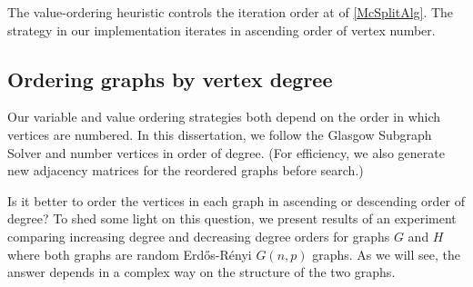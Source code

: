 The value-ordering heuristic controls the iteration
order at  of \cref{McSplitAlg}. The strategy
in our implementation iterates in ascending order of vertex number.

\subsection{Ordering graphs by vertex degree}

Our variable and value ordering strategies both depend on the order
in which vertices are numbered.
In this dissertation, we follow the Glasgow Subgraph Solver
\citep{DBLP:journals/jair/McCreeshPST18,DBLP:conf/gg/McCreeshP020}
and number vertices in order of degree. (For efficiency, we
also generate new adjacency matrices for the reordered graphs
before search.)

Is it better to order the vertices in each graph in ascending or descending
order of degree?  To shed some light on this question, we present results of an
experiment comparing increasing degree and decreasing degree orders for graphs
$G$ and $H$ where both graphs are random Erd\H{o}s-Rényi $G(n,p)$ graphs.  As
we will see, the answer depends in a complex way on the structure of the two
graphs.


